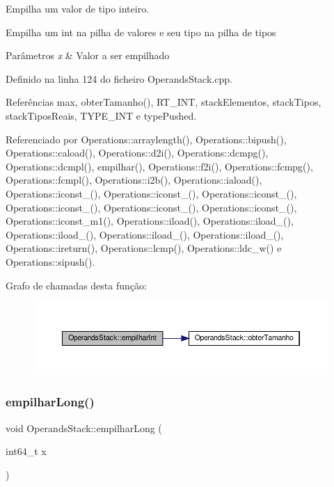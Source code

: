 Empilha um valor de tipo inteiro. 

Empilha um int na pilha de valores e seu tipo na pilha de tipos


\begin{DoxyParams}{Parâmetros}
{\em x} & Valor a ser empilhado \\
\hline
\end{DoxyParams}


Definido na linha 124 do ficheiro Operands\+Stack.\+cpp.



Referências max, obter\+Tamanho(), R\+T\+\_\+\+I\+NT, stack\+Elementos, stack\+Tipos, stack\+Tipos\+Reais, T\+Y\+P\+E\+\_\+\+I\+NT e type\+Pushed.



Referenciado por Operations\+::arraylength(), Operations\+::bipush(), Operations\+::caload(), Operations\+::d2i(), Operations\+::dcmpg(), Operations\+::dcmpl(), empilhar(), Operations\+::f2i(), Operations\+::fcmpg(), Operations\+::fcmpl(), Operations\+::i2b(), Operations\+::iaload(), Operations\+::iconst\+\_(), Operations\+::iconst\+\_(), Operations\+::iconst\+\_(), Operations\+::iconst\+\_(), Operations\+::iconst\+\_(), Operations\+::iconst\+\_(), Operations\+::iconst\+\_\+m1(), Operations\+::iload(), Operations\+::iload\+\_(), Operations\+::iload\+\_(), Operations\+::iload\+\_(), Operations\+::iload\+\_(), Operations\+::ireturn(), Operations\+::lcmp(), Operations\+::ldc\+\_\+w() e Operations\+::sipush().

Grafo de chamadas desta função\+:
\nopagebreak
\begin{figure}[H]
\begin{center}
\leavevmode
\includegraphics[width=350pt]{classOperandsStack_a5006a59c2d815e4a24b055e2e4d2e741_cgraph}
\end{center}
\end{figure}
\mbox{\label{classOperandsStack_a927ca84358d7e0f45f74d122f9a500d2}} 
\subsubsection{\texorpdfstring{empilhar\+Long()}{empilharLong()}}
{\footnotesize\ttfamily void Operands\+Stack\+::empilhar\+Long (\begin{DoxyParamCaption}\item[{int64\+\_\+t}]{x }\end{DoxyParamCaption})}



